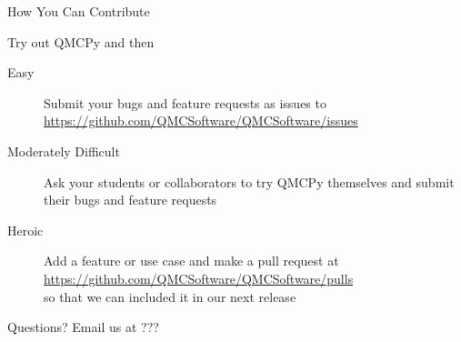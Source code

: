 \documentclass[11pt,compress,xcolor={usenames,dvipsnames},aspectratio=169]{beamer}
\begin{document}
\begin{frame}{How You Can Contribute}
	
		\vspace{-4ex}
	Try out  QMCPy and then
	
	\begin{description}
		\item[Easy] Submit your bugs and feature requests as issues to \url{https://github.com/QMCSoftware/QMCSoftware/issues}
		
		\item[Moderately Difficult]  Ask your students or collaborators to try QMCPy themselves and submit their bugs and feature requests
		
		\item[Heroic] Add a feature or use case and make a pull request at \url{https://github.com/QMCSoftware/QMCSoftware/pulls} \\ so that we can included it in our next release
	\end{description}

	
	Questions?  Email us at ???
	

\end{frame}



\thankyouframe
\end{document}
